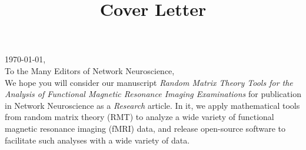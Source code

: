 \documentclass[10pt,a4paper]{article}
\begin{document}
% 
\thispagestyle{nofooter}  %
\setlength{\headheight}{30.0pt}
\normalsize

\title{Cover Letter}





\noindent
\today, \\
To the Many Editors of Network Neuroscience, \\

We hope you will consider our manuscript \emph{Random Matrix Theory Tools for the Analysis of
Functional Magnetic Resonance Imaging Examinations} for publication in Network Neuroscience as a
\emph{Research} article. In it, we apply mathematical tools from random matrix theory (RMT) to
analyze a wide variety of functional magnetic resonance imaging (fMRI) data, and release
open-source software \citep{bergerStfxecutablesEmpyricalRMTPreliminary2020} to facilitate such analyses with a wide variety of data.
\end{document}
